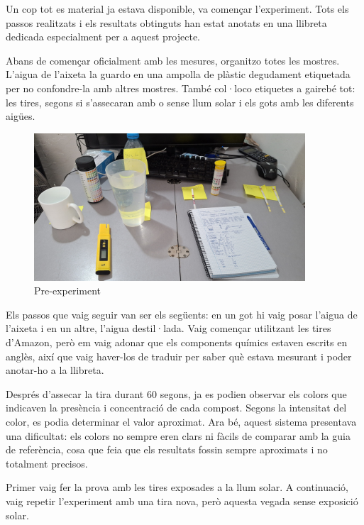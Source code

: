 
Un cop tot es material ja estava disponible, va començar l'experiment. Tots els passos realitzats i els resultats obtinguts han estat anotats en una llibreta dedicada especialment per a aquest projecte.

Abans de començar oficialment amb les mesures, organitzo totes les mostres. L’aigua de l’aixeta la guardo en una ampolla de plàstic degudament etiquetada per no confondre-la amb altres mostres. També col·loco etiquetes a gairebé tot: les tires, segons si s’assecaran amb o sense llum solar i els gots amb les diferents aigües.

\begin{figure}[h]
\centering
\includegraphics[width=0.9\textwidth, angle=0]{./Figures/expe.png}
\caption{Pre-experiment }
\label{fig:fotoPreExperiment}
\end{figure}

Els passos que vaig seguir van ser els següents: en un got hi vaig posar l’aigua de l’aixeta i en un altre, l’aigua destil·lada. Vaig començar utilitzant les tires d’Amazon, però em vaig adonar que els components químics estaven escrits en anglès, així que vaig haver-los de traduir per saber què estava mesurant i poder anotar-ho a la llibreta.

Després d’assecar la tira durant 60 segons, ja es podien observar els colors que indicaven la presència i concentració de cada compost. Segons la intensitat del color, es podia determinar el valor aproximat. Ara bé, aquest sistema presentava una dificultat: els colors no sempre eren clars ni fàcils de comparar amb la guia de referència, cosa que feia que els resultats fossin sempre aproximats i no totalment precisos.

Primer vaig fer la prova amb les tires exposades a la llum solar. A continuació, vaig repetir l’experiment amb una tira nova, però aquesta vegada sense exposició solar.


